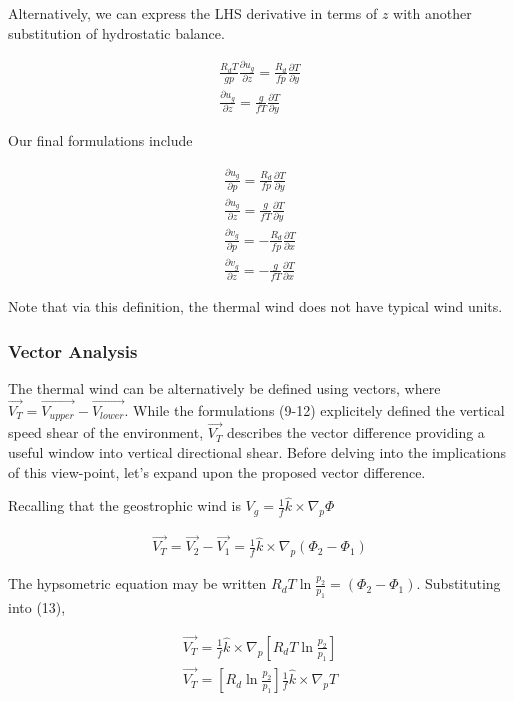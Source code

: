 \documentclass[a4paper,12pt]{article}
\begin{document}
Alternatively, we can express the LHS derivative in terms of $z$ with another substitution of hydrostatic balance.

\begin{align}
\frac{R_d T}{gp}\frac{\partial u_g}{\partial z} = \frac{R_d}{fp}\frac{\partial T}{\partial y}\\
\frac{\partial u_g}{\partial z} = \frac{g}{fT}\frac{\partial T}{\partial y}
\end{align}

Our final formulations include

\begin{align}
\boxed{\frac{\partial u_g}{\partial p} = \frac{R_d}{fp}\frac{\partial T}{\partial y}}\\
\boxed{\frac{\partial u_g}{\partial z} = \frac{g}{fT}\frac{\partial T}{\partial y}}\\
\boxed{\frac{\partial v_g}{\partial p} = -\frac{R_d}{fp}\frac{\partial T}{\partial x}}\\
\boxed{\frac{\partial v_g}{\partial z} = -\frac{g}{fT}\frac{\partial T}{\partial x}}
\end{align}

Note that via this definition, the thermal wind does not have typical wind units.

\subsubsection*{Vector Analysis}

The thermal wind can be alternatively be defined using vectors, where $\vec{V_T} = \vec{V_{upper}} - \vec{V_{lower}}$. While the formulations (9-12) explicitely defined the vertical speed shear of the environment, $\vec{V_T}$ describes the vector difference providing a useful window into vertical directional shear. Before delving into the implications of this view-point, let's expand upon the proposed vector difference.

Recalling that the geostrophic wind is $V_g = \frac{1}{f}\hat{k} \times \nabla_p \Phi$

\begin{align}
\vec{V_T} = \vec{V_2} - \vec{V_1} =  \frac{1}{f}\hat{k} \times \nabla_p (\Phi_2 - \Phi_1)
\end{align}

The hypsometric equation may be written $R_d T \ln{\frac{p_2}{p_1}} = (\Phi_2 - \Phi_1)$. Substituting into (13),

\begin{align}
\vec{V_T} = \frac{1}{f}\hat{k} \times \nabla_p \left[R_d T \ln{\frac{p_2}{p_1}}\right]\\
\vec{V_T} = \left[R_d \ln{\frac{p_2}{p_1}}\right]\frac{1}{f} \hat{k} \times \nabla_p T
\end{align}
\end{document}
